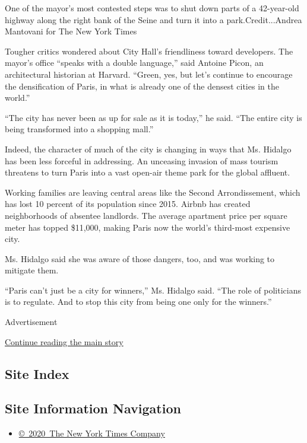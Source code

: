 One of the mayor's most contested steps was to shut down parts of a
42-year-old highway along the right bank of the Seine and turn it into a
park.Credit...Andrea Mantovani for The New York Times

Tougher critics wondered about City Hall's friendliness toward
developers. The mayor's office ``speaks with a double language,'' said
Antoine Picon, an architectural historian at Harvard. ``Green, yes, but
let's continue to encourage the densification of Paris, in what is
already one of the densest cities in the world.''

``The city has never been as up for sale as it is today,'' he said.
``The entire city is being transformed into a shopping mall.''

Indeed, the character of much of the city is changing in ways that Ms.
Hidalgo has been less forceful in addressing. An unceasing invasion of
mass tourism threatens to turn Paris into a vast open-air theme park for
the global affluent.

Working families are leaving central areas like the Second
Arrondissement, which has lost 10 percent of its population since 2015.
Airbnb has created neighborhoods of absentee landlords. The average
apartment price per square meter has topped \$11,000, making Paris now
the world's third-most expensive city.

Ms. Hidalgo said she was aware of those dangers, too, and was working to
mitigate them.

``Paris can't just be a city for winners,'' Ms. Hidalgo said. ``The role
of politicians is to regulate. And to stop this city from being one only
for the winners.''

Advertisement

\protect\hyperlink{after-bottom}{Continue reading the main story}

\hypertarget{site-index}{%
\subsection{Site Index}\label{site-index}}

\hypertarget{site-information-navigation}{%
\subsection{Site Information
Navigation}\label{site-information-navigation}}

\begin{itemize}
\tightlist
\item
  \href{https://help.nytimes3xbfgragh.onion/hc/en-us/articles/115014792127-Copyright-notice}{©~2020~The
  New York Times Company}
\end{itemize}

